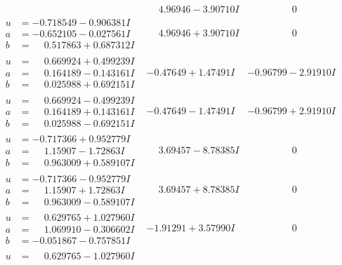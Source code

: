 \documentclass[1p]{elsarticle_modified}
\theoremstyle{definition}
\begin{document}
$$\begin{array}{c|c|c}
 & \phantom{-}4.96946 - 3.90710 I & \phantom{-0.000000 } 0 \\ \hline\begin{aligned}
u &= -0.718549 - 0.906381 I \\
a &= -0.652105 - 0.027561 I \\
b &= \phantom{-}0.517863 + 0.687312 I\end{aligned}
 & \phantom{-}4.96946 + 3.90710 I & \phantom{-0.000000 } 0 \\ \hline\begin{aligned}
u &= \phantom{-}0.669924 + 0.499239 I \\
a &= \phantom{-}0.164189 - 0.143161 I \\
b &= \phantom{-}0.025988 + 0.692151 I\end{aligned}
 & -0.47649 + 1.47491 I & -0.96799 - 2.91910 I \\ \hline\begin{aligned}
u &= \phantom{-}0.669924 - 0.499239 I \\
a &= \phantom{-}0.164189 + 0.143161 I \\
b &= \phantom{-}0.025988 - 0.692151 I\end{aligned}
 & -0.47649 - 1.47491 I & -0.96799 + 2.91910 I \\ \hline\begin{aligned}
u &= -0.717366 + 0.952779 I \\
a &= \phantom{-}1.15907 - 1.72863 I \\
b &= \phantom{-}0.963009 + 0.589107 I\end{aligned}
 & \phantom{-}3.69457 - 8.78385 I & \phantom{-0.000000 } 0 \\ \hline\begin{aligned}
u &= -0.717366 - 0.952779 I \\
a &= \phantom{-}1.15907 + 1.72863 I \\
b &= \phantom{-}0.963009 - 0.589107 I\end{aligned}
 & \phantom{-}3.69457 + 8.78385 I & \phantom{-0.000000 } 0 \\ \hline\begin{aligned}
u &= \phantom{-}0.629765 + 1.027960 I \\
a &= \phantom{-}1.069910 - 0.306602 I \\
b &= -0.051867 - 0.757851 I\end{aligned}
 & -1.91291 + 3.57990 I & \phantom{-0.000000 } 0 \\ \hline\begin{aligned}
u &= \phantom{-}0.629765 - 1.027960 I \\

\end{aligned}
\end{array}$$
\end{document}
